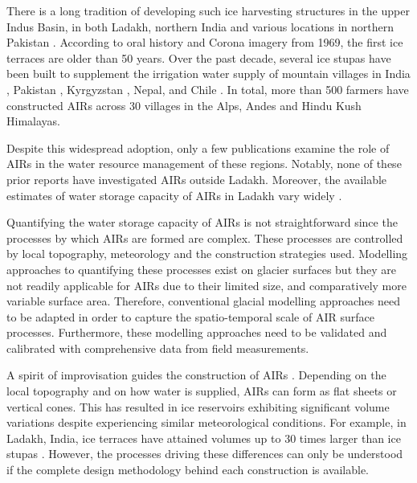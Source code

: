 There is a long tradition of developing such ice harvesting structures in the upper Indus Basin, in both Ladakh,
northern India \citep{labbalTraditionalOasesLadakh2000, nusserIrrigationDevelopmentUpper2012} and various
locations in northern Pakistan \citep{kreutzmannScarcityOpulenceWater2011}. According to oral history and Corona
imagery from 1969, the first ice terraces are older than 50 years. Over the past decade, several ice stupas have
been built to supplement the irrigation water supply of mountain villages in India
\citep{wangchukIceStupaCompetition2020, palmerStoringFrozenWater2022, aggarwalAdaptationClimateChange2021},
Pakistan \citep{awazproductionIceStupaArtificial2022}, Kyrgyzstan \citep{bbcnewsBrightArtificialGlacier2020},
Nepal, and Chile \citep{reutersConservationistsChileAim2021}. In total, more than 500 farmers have constructed
AIRs across 30 villages in the Alps, Andes and Hindu Kush Himalayas.

Despite this widespread adoption, only a few publications examine the role of \ac{AIRs} in the water resource
management of these regions. Notably, none of these prior reports have investigated \ac{AIRs} outside Ladakh.
Moreover, the available estimates of water storage capacity of \ac{AIRs} in Ladakh vary widely
\citep{norphelSnowWaterHarvesting2015, baglaArtificialGlaciersHelp1998}.

Quantifying the water storage capacity of \ac{AIRs} is not straightforward since the processes by which \ac{AIRs} are
formed are complex. These processes are controlled by local topography, meteorology and the construction
strategies used. Modelling approaches to quantifying these processes exist on glacier surfaces but they are not
readily applicable for \ac{AIRs} due to their limited size, and comparatively more variable surface area. Therefore,
conventional glacial modelling approaches need to be adapted in order to capture the
spatio-temporal scale of AIR surface processes. Furthermore, these modelling approaches need to be validated and
calibrated with comprehensive data from field measurements. 

A spirit of improvisation guides the construction of \ac{AIRs} \citep{clouseLadakhArtificialGlaciers2017}.
Depending on the local topography and on how water is supplied, \ac{AIRs} can form as flat sheets
or vertical cones. This has resulted in ice reservoirs exhibiting significant volume variations despite
experiencing similar meteorological conditions. For example, in Ladakh, India, ice terraces have attained volumes up to 30 times
larger than ice stupas \citep{nusserSociohydrologyArtificialGlaciers2019}. However, the
processes driving these differences can only be understood if the complete design methodology behind each construction is available.

